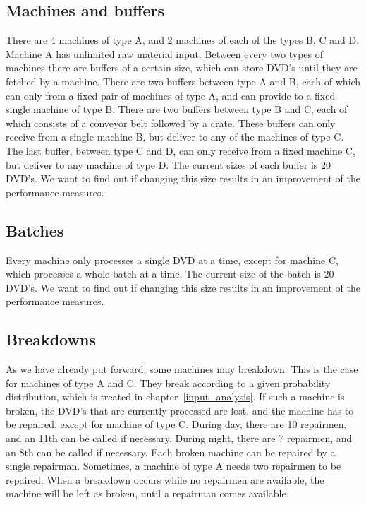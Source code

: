 \documentclass{article}
\begin{document}
\subsection{Machines and buffers}
There are 4 machines of type A, and 2 machines of each of the types B, C and D.
Machine A has unlimited raw material input.
Between every two types of machines there are buffers of a certain size, which can store DVD's until they are fetched by a machine.
There are two buffers between type A and B, each of which can only from a fixed pair of machines of type A, and can provide to a fixed single machine of type B.
There are two buffers between type B and C, each of which consists of a conveyor belt followed by a crate.
These buffers can only receive from a single machine B, but deliver to any of the machines of type C.
The last buffer, between type C and D, can only receive from a fixed machine C, but deliver to any machine of type D.
The current sizes of each buffer is 20 DVD's.
We want to find out if changing this size results in an improvement of the performance measures.

\subsection{Batches}
Every machine only processes a single DVD at a time, except for machine C, which processes a whole batch at a time.
The current size of the batch is 20 DVD's.
We want to find out if changing this size results in an improvement of the performance measures.


\subsection{Breakdowns}
As we have already put forward, some machines may breakdown.
This is the case for machines of type A and C.
They break according to a given probability distribution, which is treated in chapter~\ref{input_analysis}.
If such a machine is broken, the DVD's that are currently processed are lost, and the machine has to be repaired, except for machine of type C.
During day, there are 10 repairmen, and an 11th can be called if necessary.
During night, there are 7 repairmen, and an 8th can be called if necessary.
Each broken machine can be repaired by a single repairman.
Sometimes, a machine of type A needs two repairmen to be repaired.
When a breakdown occurs while no repairmen are available, the machine will be left as broken, until a repairman comes available.
\end{document}
